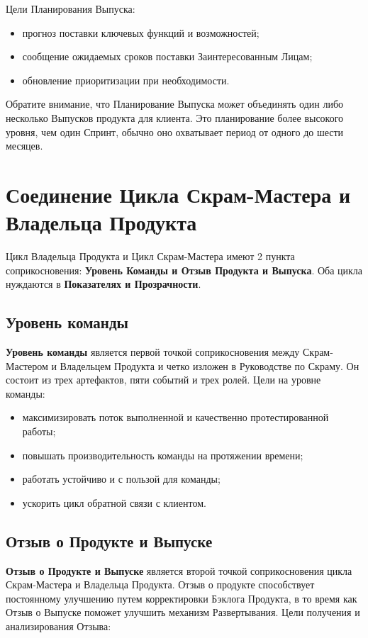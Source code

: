 \documentclass[12pt,a4paper,parskip=full]{scrartcl}
\begin{document}
Цели Планирования Выпуска: 

\begin{itemize}
	\item прогноз поставки ключевых функций и возможностей; 
	\item сообщение ожидаемых сроков поставки Заинтересованным Лицам; 
	\item обновление приоритизации при необходимости.
\end{itemize}

Обратите внимание, что Планирование Выпуска может объединять один либо несколько Выпусков продукта для клиента. Это планирование более высокого уровня, чем один Спринт, обычно оно охватывает период от одного до шести месяцев.

\section{Соединение Цикла Скрам-Мастера и Владельца Продукта}

Цикл Владельца Продукта и Цикл Скрам-Мастера имеют 2 пункта соприкосновения: \textbf{Уровень Команды и Отзыв Продукта и Выпуска}. Оба цикла нуждаются в \textbf{Показателях и Прозрачности}.

\subsection{Уровень команды}

 \textbf{Уровень команды} является первой точкой соприкосновения между Скрам-Мастером и Владельцем Продукта и четко изложен в Руководстве по Скраму. Он состоит из трех артефактов, пяти событий и трех ролей. Цели на уровне команды:

\begin{itemize}
	\item максимизировать поток выполненной и качественно протестированной работы;
	\item повышать производительность команды на протяжении времени; 
	\item работать устойчиво и с пользой для команды;
	\item ускорить цикл обратной связи с клиентом.
\end{itemize}

\subsection{Отзыв о Продукте и Выпуске}

\textbf{Отзыв о Продукте и Выпуске} является второй точкой соприкосновения цикла Скрам-Мастера и Владельца Продукта. Отзыв о продукте способствует постоянному улучшению путем корректировки Бэклога Продукта, в то время как Отзыв о Выпуске поможет улучшить механизм Развертывания. Цели получения и анализирования Отзыва:
\end{document}
